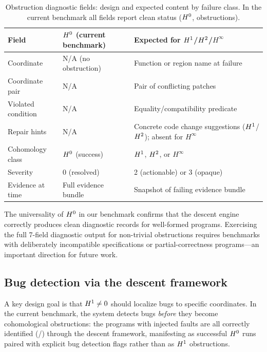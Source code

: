 \documentclass[11pt]{article}
\begin{document}
\begin{table}[ht]
\centering
\caption{Obstruction diagnostic fields: design and expected content by
  failure class.  In the current benchmark all fields report clean status
  ($H^{0}$, \compObstructionTotal{} obstructions).}
\label{tab:obstruction-fields}
\begin{tabular}{@{}lp{3.5cm}p{5.5cm}@{}}
\toprule
\textbf{Field} & \textbf{$H^{0}$ (current benchmark)} & \textbf{Expected for $H^{1}$/$H^{2}$/$H^{\infty}$} \\
\midrule
Coordinate            & N/A (no obstruction) & Function or region name at failure \\
Coordinate pair       & N/A & Pair of conflicting patches \\
Violated condition    & N/A & Equality/compatibility predicate \\
Repair hints          & N/A & Concrete code change suggestions ($H^{1}$/$H^{2}$); absent for $H^{\infty}$ \\
Cohomology class      & $H^{0}$ (success) & $H^{1}$, $H^{2}$, or $H^{\infty}$ \\
Severity              & 0 (resolved) & 2 (actionable) or 3 (opaque) \\
Evidence at time      & Full evidence bundle & Snapshot of failing evidence bundle \\
\bottomrule
\end{tabular}
\end{table}

The universality of $H^{0}$ in our benchmark confirms that the descent
engine correctly produces clean diagnostic records for well-formed programs.
Exercising the full 7-field diagnostic output for non-trivial obstructions
requires benchmarks with deliberately incompatible specifications or
partial-correctness programs---an important direction for future work.

\subsection{Bug detection via the descent framework}\label{ssec:h1-localization}

A key design goal is that $H^{1} \neq 0$ should localize bugs to
specific coordinates.  In the current benchmark, the system detects bugs
\emph{before} they become cohomological obstructions: the
\compBuggyCount{} programs with injected faults are all correctly
identified (\compBuggyFullPass{}/\compBuggyCount{}) through the descent
framework, manifesting as successful $H^{0}$ runs paired with explicit
bug detection flags rather than as $H^{1}$ obstructions.
\end{document}
